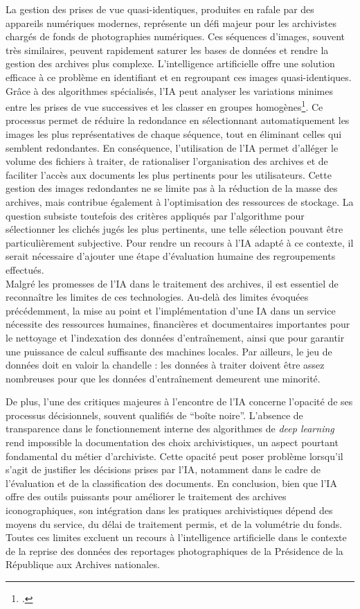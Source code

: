 La gestion des prises de vue quasi-identiques, produites en rafale par des appareils numériques modernes, représente un défi majeur pour les archivistes chargés de fonds de photographies numériques. Ces séquences d'images, souvent très similaires, peuvent rapidement saturer les bases de données et rendre la gestion des archives plus complexe. L'intelligence artificielle offre une solution efficace à ce problème en identifiant et en regroupant ces images quasi-identiques. Grâce à des algorithmes spécialisés, l’IA peut analyser les variations minimes entre les prises de vue successives et les classer en groupes homogènes\footcite{rolan2019more}. Ce processus permet de réduire la redondance en sélectionnant automatiquement les images les plus représentatives de chaque séquence, tout en éliminant celles qui semblent redondantes. En conséquence, l'utilisation de l'IA permet d'alléger le volume des fichiers à traiter, de rationaliser l'organisation des archives et de faciliter l'accès aux documents les plus pertinents pour les utilisateurs. Cette gestion des images redondantes ne se limite pas à la réduction de la masse des archives, mais contribue également à l'optimisation des ressources de stockage.
La question subsiste toutefois des critères appliqués par l’algorithme pour sélectionner les clichés jugés les plus pertinents, une telle sélection pouvant être particulièrement subjective. Pour rendre un recours à l’IA adapté à ce contexte, il serait nécessaire d’ajouter une étape d’évaluation humaine des regroupements effectués.
\\

Malgré les promesses de l’IA dans le traitement des archives, il est essentiel de reconnaître les limites de ces technologies. Au-delà des limites évoquées précédemment, la mise au point et l’implémentation d’une IA dans un service nécessite des ressources humaines, financières et documentaires importantes pour le nettoyage et l’indexation des données d’entraînement, ainsi que pour garantir une puissance de calcul suffisante des machines locales. Par ailleurs, le jeu de données doit en valoir la chandelle : les données à traiter doivent être assez nombreuses pour que les données d’entraînement demeurent une minorité.

De plus, l'une des critiques majeures à l'encontre de l'IA concerne l'opacité de ses processus décisionnels, souvent qualifiés de \enquote{boîte noire}. L’absence de transparence dans le fonctionnement interne des algorithmes de \emph{deep learning} rend impossible la documentation des choix archivistiques, un aspect pourtant fondamental du métier d'archiviste. Cette opacité peut poser problème lorsqu’il s’agit de justifier les décisions prises par l’IA, notamment dans le cadre de l’évaluation et de la classification des documents. En conclusion, bien que l’IA offre des outils puissants pour améliorer le traitement des archives iconographiques, son intégration dans les pratiques archivistiques dépend des moyens du service, du délai de traitement permis, et de la volumétrie du fonds. Toutes ces limites excluent un recours à l’intelligence artificielle dans le contexte de la reprise des données des reportages photographiques de la Présidence de la République aux Archives nationales.

